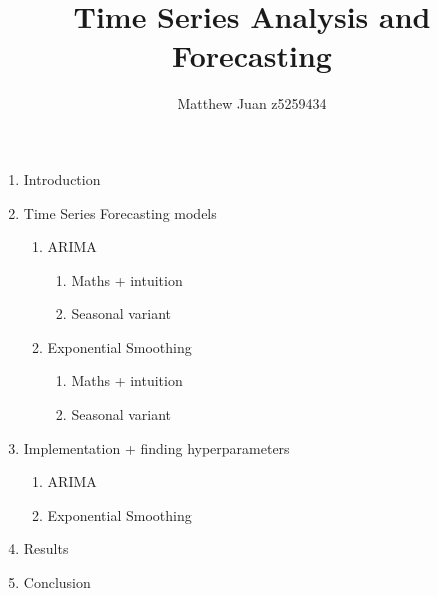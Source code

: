 \documentclass{article}
\title{Time Series Analysis and Forecasting}
\author{Matthew Juan z5259434}
\date{}
\begin{document}
  \maketitle
  \begin{enumerate}
    \item Introduction
    \item Time Series Forecasting models
    \begin{enumerate}
      \item ARIMA
      \begin{enumerate}
        \item Maths + intuition
        \item Seasonal variant
      \end{enumerate}
      \item Exponential Smoothing
      \begin{enumerate}
        \item Maths + intuition
        \item Seasonal variant
      \end{enumerate}
    \end{enumerate}
    \item Implementation + finding hyperparameters
    \begin{enumerate}
      \item ARIMA
      \item Exponential Smoothing
    \end{enumerate}
    \item Results
    \item Conclusion
  \end{enumerate}
\end{document}

